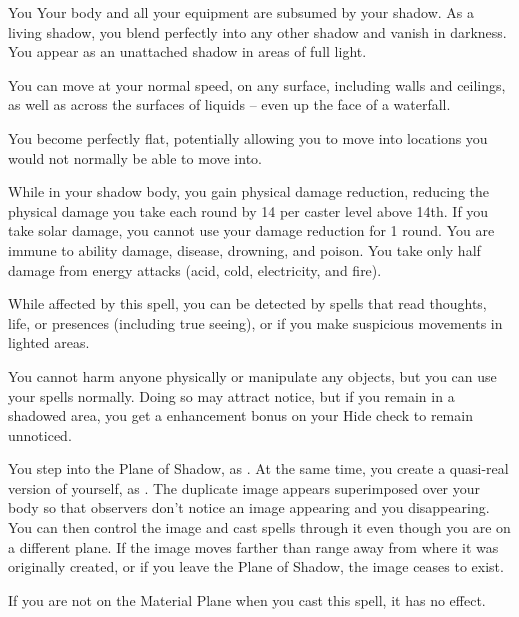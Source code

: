 \spelldur{\durmed \dismissable}
\begin{spelltarget}{You}
    \spelleffect Your body and all your equipment are subsumed by your shadow. As a living shadow, you blend perfectly into any other shadow and vanish in darkness. You appear as an unattached shadow in areas of full light.
    \par You can move at your normal speed, on any surface, including walls and ceilings, as well as across the surfaces of liquids -- even up the face of a waterfall.
    \par You become perfectly flat, potentially allowing you to move into locations you would not normally be able to move into.
    \par While in your shadow body, you gain physical damage reduction, reducing the physical damage you take each round by 14  per caster level above 14th. If you take solar damage, you cannot use your damage reduction for 1 round. You are immune to ability damage, disease, drowning, and poison. You take only half damage from energy attacks (acid, cold, electricity, and fire).
    \par While affected by this spell, you can be detected by spells that read thoughts, life, or presences (including true seeing), or if you make suspicious movements in lighted areas.
    \par You cannot harm anyone physically or manipulate any objects, but you can use your spells normally. Doing so may attract notice, but if you remain in a shadowed area, you get a  enhancement bonus on your Hide check to remain unnoticed.
\end{spelltarget}

\spelldur{\durmed}
\spellline
\spelleffect You step into the Plane of Shadow, as . At the same time, you create a quasi-real version of yourself, as . The duplicate image appears superimposed over your body so that observers don't notice an image appearing and you disappearing. You can then control the image and cast spells through it even though you are on a different plane.
\spellnotes If the image moves farther than \rnglong range away from where it was originally created, or if you leave the Plane of Shadow, the image ceases to exist.

If you are not on the Material Plane when you cast this spell, it has no effect.

